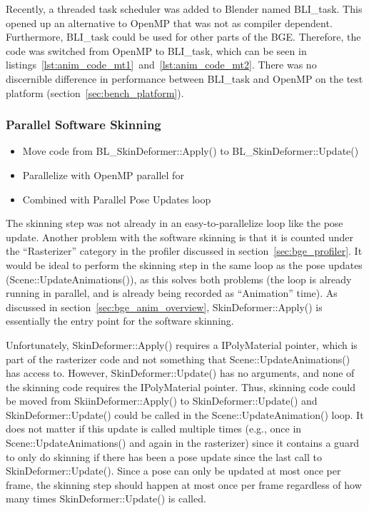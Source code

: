 Recently, a threaded task scheduler was added to Blender named BLI\_task. 
This opened up an alternative to OpenMP that was not as compiler dependent.
Furthermore, BLI\_task could be used for other parts of the BGE.
Therefore, the code was switched from OpenMP to BLI\_task, which can be seen in listings~\ref{lst:anim_code_mt1}~and~\ref{lst:anim_code_mt2}.
There was no discernible difference in performance between BLI\_task and OpenMP on the test platform (section~\ref{sec:bench_platform}).



\subsubsection{Parallel Software Skinning}
\label{sec:parallel_software_skinning}
\ifsummaries
\begin{itemize}
 \item Move code from BL\_SkinDeformer::Apply() to BL\_SkinDeformer::Update()
 \item Parallelize with OpenMP parallel for
 \item Combined with Parallel Pose Updates loop
\end{itemize}
\fi

The skinning step was not already in an easy-to-parallelize loop like the pose update.
Another problem with the software skinning is that it is counted under the ``Rasterizer'' category in the profiler discussed in section~\ref{sec:bge_profiler}.
It would be ideal to perform the skinning step in the same loop as the pose updates (Scene::UpdateAnimations()), as this solves both problems (the loop is already running in parallel, and is already being recorded as ``Animation'' time).
As discussed in section~\ref{sec:bge_anim_overview}, SkinDeformer::Apply() is essentially the entry point for the software skinning.

Unfortunately, SkinDeformer::Apply() requires a IPolyMaterial pointer, which is part of the rasterizer code and not something that Scene::UpdateAnimations() has access to.
However, SkinDeformer::Update() has no arguments, and none of the skinning code requires the IPolyMaterial pointer.
Thus, skinning code could be moved from SkiinDeformer::Apply() to SkinDeformer::Update() and SkinDeformer::Update() could be called in the Scene::UpdateAnimation() loop.
It does not matter if this update is called multiple times (e.g., once in Scene::UpdateAnimations() and again in the rasterizer) since it contains a guard to only do skinning if there has been a pose update since the last call to SkinDeformer::Update().
Since a pose can only be updated at most once per frame, the skinning step should happen at most once per frame regardless of how many times SkinDeformer::Update() is called.

